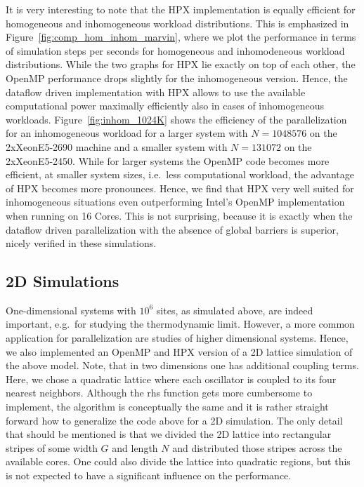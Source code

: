 \documentclass[10pt]{scrartcl}
\begin{document}
It is very interesting to note that the HPX implementation is equally efficient for homogeneous and inhomogeneous workload distributions.
This is emphasized in Figure~\ref{fig:comp_hom_inhom_marvin}, where we plot the performance in terms of simulation steps per seconds for homogeneous and inhomodeneous workload distributions.
While the two graphs for HPX lie exactly on top of each other, the OpenMP performance drops slightly for the inhomogeneous version.
Hence, the dataflow driven implementation with HPX allows to use the available computational power maximally efficiently also in cases of inhomogeneous workloads.
Figure~\ref{fig:inhom_1024K} shows the efficiency of the parallelization for an inhomogeneous workload for a larger system with $N=1048576$ on the 2xXeonE5-2690 machine and a smaller system with $N=131072$ on the 2xXeonE5-2450.
While for larger systems the OpenMP code becomes more efficient, at smaller system sizes, i.e.\ less computational workload, the advantage of HPX becomes more pronounces.
Hence, we find that HPX very well suited for inhomogeneous situations even outperforming Intel's OpenMP implementation when running on 16 Cores.
This is not surprising, because it is exactly when the dataflow driven parallelization with the absence of global barriers is superior, nicely verified in these simulations.

\subsection{2D Simulations}

One-dimensional systems with $10^6$ sites, as simulated above, are indeed important, e.g.\ for studying the thermodynamic limit.
However, a more common application for parallelization are studies of higher dimensional systems.
Hence, we also implemented an OpenMP and HPX version of a 2D lattice simulation of the above model.
Note, that in two dimensions one has additional coupling terms.
Here, we chose a quadratic lattice where each oscillator is coupled to its four nearest neighbors.
Although the rhs function gets more cumbersome to implement, the algorithm is conceptually the same and it is rather straight forward how to generalize the code above for a 2D simulation.
The only detail that should be mentioned is that we divided the 2D lattice into rectangular stripes of some width $G$ and length $N$ and distributed those stripes across the available cores.
One could also divide the lattice into quadratic regions, but this is not expected to have a significant influence on the performance.
\end{document}
